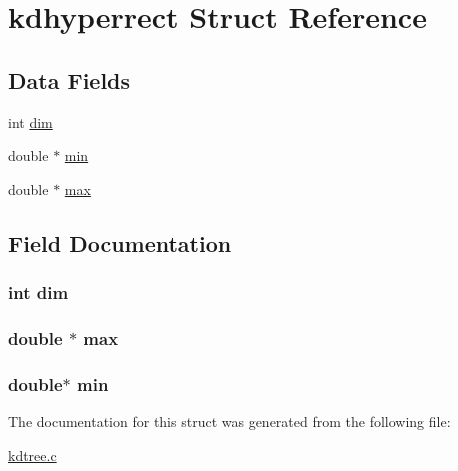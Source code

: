 \hypertarget{a00008}{\section{kdhyperrect \-Struct \-Reference}
\label{d4/dee/a00008}
}
\subsection*{\-Data \-Fields}
\begin{DoxyCompactItemize}
\item 
int \hyperlink{a00008_a70b5e28b5bc3d1b63a7435c5fe50b837_a70b5e28b5bc3d1b63a7435c5fe50b837}{dim}
\item 
double $\ast$ \hyperlink{a00008_a84ea468000e399560bbee8281490337d_a84ea468000e399560bbee8281490337d}{min}
\item 
double $\ast$ \hyperlink{a00008_a1a9be85667cb2f50d8abcfcb4edb17c7_a1a9be85667cb2f50d8abcfcb4edb17c7}{max}
\end{DoxyCompactItemize}


\subsection{\-Field \-Documentation}
\hypertarget{a00008_a70b5e28b5bc3d1b63a7435c5fe50b837_a70b5e28b5bc3d1b63a7435c5fe50b837}{
\subsubsection[{dim}]{\setlength{\rightskip}{0pt plus 5cm}int {\bf dim}}}\label{d4/dee/a00008_a70b5e28b5bc3d1b63a7435c5fe50b837_a70b5e28b5bc3d1b63a7435c5fe50b837}
\hypertarget{a00008_a1a9be85667cb2f50d8abcfcb4edb17c7_a1a9be85667cb2f50d8abcfcb4edb17c7}{
\subsubsection[{max}]{\setlength{\rightskip}{0pt plus 5cm}double $\ast$ {\bf max}}}\label{d4/dee/a00008_a1a9be85667cb2f50d8abcfcb4edb17c7_a1a9be85667cb2f50d8abcfcb4edb17c7}
\hypertarget{a00008_a84ea468000e399560bbee8281490337d_a84ea468000e399560bbee8281490337d}{
\subsubsection[{min}]{\setlength{\rightskip}{0pt plus 5cm}double$\ast$ {\bf min}}}\label{d4/dee/a00008_a84ea468000e399560bbee8281490337d_a84ea468000e399560bbee8281490337d}


\-The documentation for this struct was generated from the following file\-:\begin{DoxyCompactItemize}
\item 
\hyperlink{a00013}{kdtree.\-c}\end{DoxyCompactItemize}
